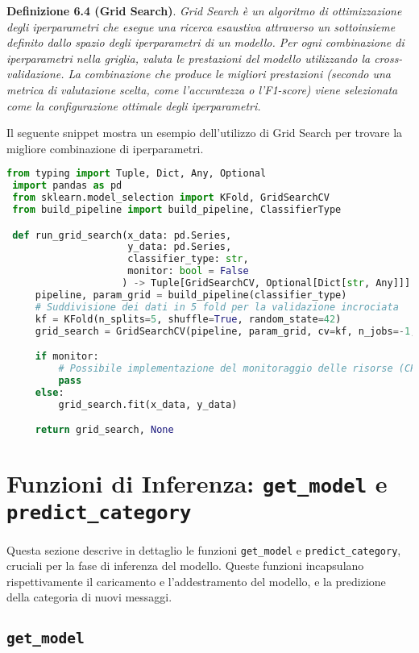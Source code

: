  \textbf{Definizione 6.4 (Grid Search)}. \textit{Grid Search è un algoritmo di ottimizzazione degli iperparametri che esegue una ricerca esaustiva attraverso un sottoinsieme definito dallo spazio degli iperparametri di un modello. Per ogni combinazione di iperparametri nella griglia, valuta le prestazioni del modello utilizzando la cross-validazione. La combinazione che produce le migliori prestazioni (secondo una metrica di valutazione scelta, come l'accuratezza o l'F1-score) viene selezionata come la configurazione ottimale degli iperparametri.}

 Il seguente snippet mostra un esempio dell'utilizzo di Grid Search per trovare la migliore combinazione di iperparametri.

 \begin{lstlisting}[language=Python]
 from typing import Tuple, Dict, Any, Optional
 import pandas as pd
 from sklearn.model_selection import KFold, GridSearchCV
 from build_pipeline import build_pipeline, ClassifierType

 def run_grid_search(x_data: pd.Series,
                     y_data: pd.Series,
                     classifier_type: str,
                     monitor: bool = False
                    ) -> Tuple[GridSearchCV, Optional[Dict[str, Any]]]:
     pipeline, param_grid = build_pipeline(classifier_type)
     # Suddivisione dei dati in 5 fold per la validazione incrociata
     kf = KFold(n_splits=5, shuffle=True, random_state=42)
     grid_search = GridSearchCV(pipeline, param_grid, cv=kf, n_jobs=-1, verbose=0)

     if monitor:
         # Possibile implementazione del monitoraggio delle risorse (CPU, memoria, tempo)
         pass
     else:
         grid_search.fit(x_data, y_data)

     return grid_search, None
 \end{lstlisting}

 \section{Funzioni di Inferenza: \texttt{get\_model} e \texttt{predict\_category}}

 Questa sezione descrive in dettaglio le funzioni \texttt{get\_model} e \texttt{predict\_category}, cruciali per la fase di inferenza del modello. Queste funzioni incapsulano rispettivamente il caricamento e l'addestramento del modello, e la predizione della categoria di nuovi messaggi.

 \subsection{\texttt{get\_model}}

